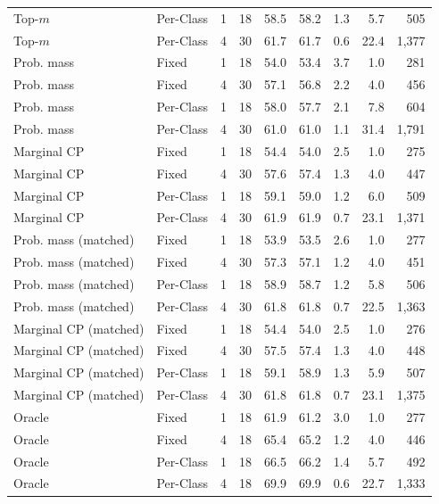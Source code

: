 \begin{tabular}{llrrrrrrr}
Top-$m$ & Per-Class & 1 & 18 & 58.5 & 58.2 & 1.3 & 5.7 & 505 \\
Top-$m$ & Per-Class & 4 & 30 & 61.7 & 61.7 & 0.6 & 22.4 & 1,377 \\
Prob. mass & Fixed & 1 & 18 & 54.0 & 53.4 & 3.7 & 1.0 & 281 \\
Prob. mass & Fixed & 4 & 30 & 57.1 & 56.8 & 2.2 & 4.0 & 456 \\
Prob. mass & Per-Class & 1 & 18 & 58.0 & 57.7 & 2.1 & 7.8 & 604 \\
Prob. mass & Per-Class & 4 & 30 & 61.0 & 61.0 & 1.1 & 31.4 & 1,791 \\
Marginal CP & Fixed & 1 & 18 & 54.4 & 54.0 & 2.5 & 1.0 & 275 \\
Marginal CP & Fixed & 4 & 30 & 57.6 & 57.4 & 1.3 & 4.0 & 447 \\
Marginal CP & Per-Class & 1 & 18 & 59.1 & 59.0 & 1.2 & 6.0 & 509 \\
Marginal CP & Per-Class & 4 & 30 & 61.9 & 61.9 & 0.7 & 23.1 & 1,371 \\
Prob. mass (matched) & Fixed & 1 & 18 & 53.9 & 53.5 & 2.6 & 1.0 & 277 \\
Prob. mass (matched) & Fixed & 4 & 30 & 57.3 & 57.1 & 1.2 & 4.0 & 451 \\
Prob. mass (matched) & Per-Class & 1 & 18 & 58.9 & 58.7 & 1.2 & 5.8 & 506 \\
Prob. mass (matched) & Per-Class & 4 & 30 & 61.8 & 61.8 & 0.7 & 22.5 & 1,363 \\
Marginal CP (matched) & Fixed & 1 & 18 & 54.4 & 54.0 & 2.5 & 1.0 & 276 \\
Marginal CP (matched) & Fixed & 4 & 30 & 57.5 & 57.4 & 1.3 & 4.0 & 448 \\
Marginal CP (matched) & Per-Class & 1 & 18 & 59.1 & 58.9 & 1.3 & 5.9 & 507 \\
Marginal CP (matched) & Per-Class & 4 & 30 & 61.8 & 61.8 & 0.7 & 23.1 & 1,375 \\
Oracle & Fixed & 1 & 18 & 61.9 & 61.2 & 3.0 & 1.0 & 277 \\
Oracle & Fixed & 4 & 18 & 65.4 & 65.2 & 1.2 & 4.0 & 446 \\
Oracle & Per-Class & 1 & 18 & 66.5 & 66.2 & 1.4 & 5.7 & 492 \\
Oracle & Per-Class & 4 & 18 & 69.9 & 69.9 & 0.6 & 22.7 & 1,333 \\
\bottomrule
\end{tabular}
